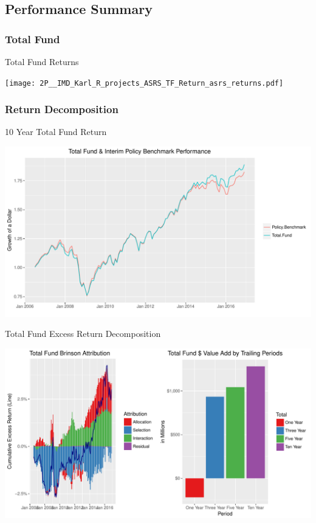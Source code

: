 \documentclass[10pt,english]{beamer}\usepackage[]{graphicx}\usepackage[]{color}
\makeatletter
\def\maxwidth{ %
  \ifdim\Gin@nat@width>\linewidth
    \linewidth
  \else
    \Gin@nat@width
  \fi
}
\newenvironment{knitrout}{}{} %
\makeatother
\begin{document}
\subsection{Performance Summary}

\subsubsection{Total Fund}
\begin{frame}{Total Fund Returns}

\texttt{[image: 2P\_\_IMD\_Karl\_R\_projects\_ASRS\_TF\_Return\_asrs\_returns.pdf]}
\end{frame}
%

\subsubsection{Return Decomposition}
\begin{frame}[fragile]{10 Year Total Fund Return}

\begin{knitrout}
\color{fgcolor}
\includegraphics[width=\maxwidth]{figure/total_return-1} 

\end{knitrout}
\end{frame}
%
\begin{frame}[fragile]{Total Fund Excess Return Decomposition}

\begin{knitrout}
\color{fgcolor}
\includegraphics[width=\maxwidth]{figure/tf_brinson-1} 

\end{knitrout}
\end{frame}
\end{document}
